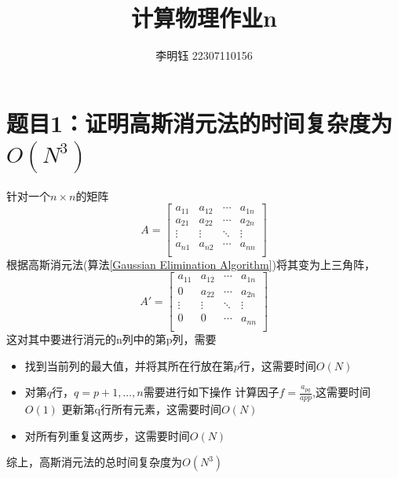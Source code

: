 \documentclass[11pt]{article}
\author{李明钰 22307110156}
\title{计算物理作业n}
\begin{document}
\maketitle

\section{题目1：证明高斯消元法的时间复杂度为$O(N^3)$}
针对一个$n\times n$的矩阵
\begin{equation}
    A = \left[ 
    \begin{matrix}
a_{11} & a_{12} & \cdots & a_{1n} \\
a_{21} & a_{22} & \cdots & a_{2n} \\
\vdots  & \vdots  & \ddots & \vdots  \\
a_{n1} & a_{n2} & \cdots & a_{nn} \\
\end{matrix}
\right]
\end{equation}
根据高斯消元法(算法\ref{Gaussian Elimination Algorithm})将其变为上三角阵，
\begin{equation}
    A' = \left[ 
    \begin{matrix}
a_{11} & a_{12} & \cdots & a_{1n} \\
0 & a_{22} & \cdots & a_{2n} \\
\vdots  & \vdots  & \ddots & \vdots  \\
0 & 0 & \cdots & a_{nn} \\
\end{matrix}
\right]
\end{equation}
这对其中要进行消元的n列中的第p列，需要
\begin{itemize}
    \item 找到当前列的最大值，并将其所在行放在第$p$行，这需要时间$O(N)$
    \item 对第$q$行，$q=p+1,\ldots,n$需要进行如下操作
        \subitem 计算因子$f=\frac{a_{pq}}{a{pp}}$,这需要时间$O(1)$
        \subitem 更新第q行所有元素，这需要时间$O(N)$
    \item 对所有列重复这两步，这需要时间$O(N)$
\end{itemize}
综上，高斯消元法的总时间复杂度为$O(N^3)$
\end{document}

